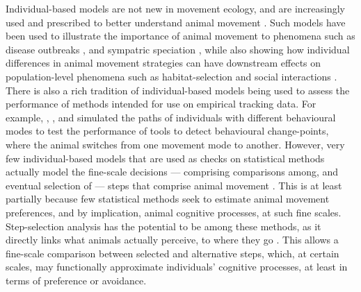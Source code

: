     Individual-based models are not new in movement ecology, and are increasingly used and prescribed to better understand animal movement \citep[see a review in][]{deangelis2019}.
    Such models have been used to illustrate the importance of animal movement to phenomena such as disease outbreaks \citep{white2018}, and sympatric speciation \citep{getz2015}, while also showing how individual differences in animal movement strategies can have downstream effects on population-level phenomena such as habitat-selection and social interactions \citep{spiegel2017,spiegel2016a}.
    There is also a rich tradition of individual-based models being used to assess the performance of methods intended for use on empirical tracking data.
    For example, \citealt{gurarie2016}, \citealt{michelot2016}, and \citealt{patin2020a} simulated the paths of individuals with different behavioural modes to test the performance of tools to detect behavioural change-points, where the animal switches from one movement mode to another.
    However, very few individual-based models that are used as checks on statistical methods actually model the fine-scale decisions --- comprising comparisons among, and eventual selection of --- steps that comprise animal movement \citep[but see recently][]{vissat2021}.
    This is at least partially because few statistical methods seek to estimate animal movement preferences, and by implication, animal cognitive processes, at such fine scales.
    Step-selection analysis has the potential to be among these methods, as it directly links what animals actually perceive, to where they go \citep[see recently][]{aben2021}.
    This allows a fine-scale comparison between selected and alternative steps, which, at certain scales, may functionally approximate individuals' cognitive processes, at least in terms of preference or avoidance.
    
